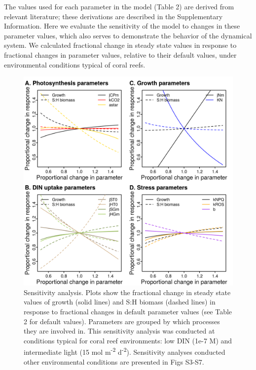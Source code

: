 \documentclass[]{elsarticle} %
\makeatletter
\def\maxwidth{\ifdim\Gin@nat@width>\linewidth\linewidth
\else\Gin@nat@width\fi}
\let\Oldincludegraphics\includegraphics
\renewcommand{\includegraphics}[1]{\Oldincludegraphics[width=\maxwidth]{#1}}
\makeatother
\begin{document}
The values used for each parameter in the model (Table 2) are derived
from relevant literature; these derivations are described in the
Supplementary Information. Here we evaluate the sensitivity of the model
to changes in these parameter values, which also serves to demonstrate
the behavior of the dynamical system. We calculated fractional change in
steady state values in response to fractional changes in parameter
values, relative to their default values, under environmental conditions
typical of coral reefs.

\begin{figure}[htbp]
\centering
\includegraphics{../img/Fig4.png}
\caption{Sensitivity analysis. Plots show the fractional change in
steady state values of growth (solid lines) and S:H biomass (dashed
lines) in response to fractional changes in default parameter values
(see Table 2 for default values). Parameters are grouped by which
processes they are involved in. This sensitivity analysis was conducted
at conditions typical for coral reef environments: low DIN (1e-7 M) and
intermediate light (15 mol m\textsuperscript{-2} d\textsuperscript{-2}).
Sensitivity analyses conducted other environmental conditions are
presented in Figs S3-S7.}
\end{figure}
\end{document}
